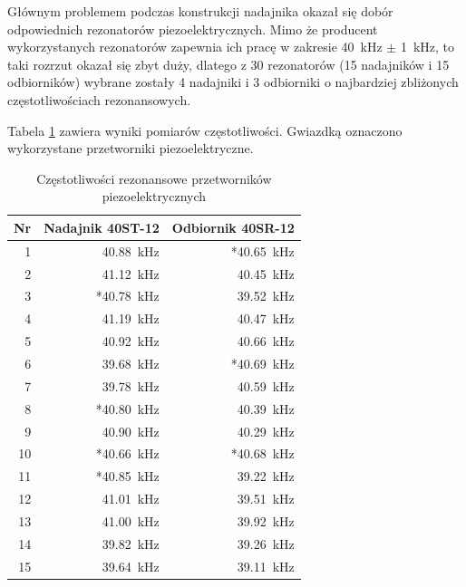 Głównym problemem podczas konstrukcji nadajnika okazał się dobór odpowiednich rezonatorów piezoelektrycznych.
Mimo że producent wykorzystanych rezonatorów zapewnia ich pracę w zakresie \SI{40}{kHz} $\pm$ \SI{1}{kHz},
to taki rozrzut okazał się zbyt duży, 
dlatego z 30 rezonatorów (15 nadajników i 15 odbiorników) wybrane zostały 4 nadajniki i 3 odbiorniki o najbardziej 
zbliżonych częstotliwościach rezonansowych.

Tabela \ref{table:czestotliwosci} zawiera wyniki pomiarów częstotliwości. Gwiazdką oznaczono wykorzystane przetworniki piezoelektryczne.

\begin{table}[t]
  \caption{Częstotliwości rezonansowe przetworników piezoelektrycznych}
  \label{table:czestotliwosci}
  \centering
  \begin{tabular}{|r|r|r|}
    \hline 
    Nr & Nadajnik 40ST-12 & Odbiornik 40SR-12\\
    \hline
    1  &   \SI{40,88}{kHz} & *\SI{40,65}{kHz} \\
    2  &   \SI{41,12}{kHz} &  \SI{40,45}{kHz} \\
    3  &  *\SI{40,78}{kHz} &  \SI{39,52}{kHz} \\
    4  &   \SI{41,19}{kHz} &  \SI{40,47}{kHz} \\
    5  &   \SI{40,92}{kHz} &  \SI{40,66}{kHz} \\
    6  &   \SI{39,68}{kHz} & *\SI{40,69}{kHz} \\
    7  &   \SI{39,78}{kHz} &  \SI{40,59}{kHz} \\
    8  &  *\SI{40,80}{kHz} &  \SI{40,39}{kHz} \\
    9  &   \SI{40,90}{kHz} &  \SI{40,29}{kHz} \\
    10 &  *\SI{40,66}{kHz} & *\SI{40,68}{kHz} \\
    11 &  *\SI{40,85}{kHz} &  \SI{39,22}{kHz} \\
    12 &   \SI{41,01}{kHz} &  \SI{39,51}{kHz} \\
    13 &   \SI{41,00}{kHz} &  \SI{39,92}{kHz} \\
    14 &   \SI{39,82}{kHz} &  \SI{39,26}{kHz} \\
    15 &   \SI{39,64}{kHz} &  \SI{39,11}{kHz} \\
    \hline
  \end{tabular}
\end{table}


